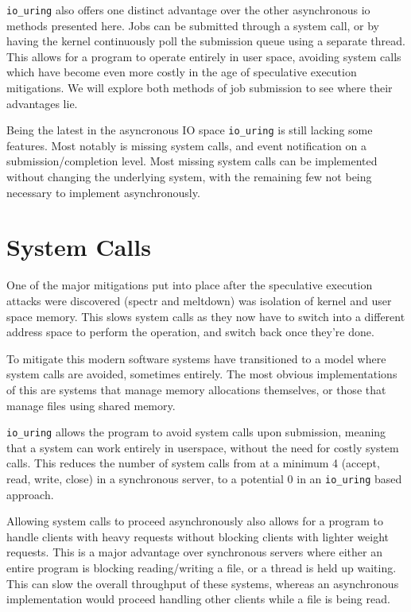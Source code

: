 \documentclass[letterpaper, 10pt, twocolumn]{article}
\begin{document}
\texttt{io\_uring} also offers one distinct advantage over the other asynchronous io methods presented here. Jobs can be submitted through a system call, or by having the kernel continuously poll the submission queue using a separate thread. This allows for a program to operate entirely in user space, avoiding system calls which have become even more costly in the age of speculative execution mitigations. We will explore both methods of job submission to see where their advantages lie.

Being the latest in the asyncronous IO space \texttt{io\_uring} is still lacking some features. Most notably is missing system calls, and event notification on a submission/completion level. Most missing system calls can be implemented without changing the underlying system, with the remaining few not being necessary to implement asynchronously.

\section{System Calls}
\label{sec:org494303b}
One of the major mitigations put into place after the speculative execution attacks were discovered (spectr and meltdown) was isolation of kernel and user space memory. This slows system calls as they now have to switch into a different address space to perform the operation, and switch back once they're done.

To mitigate this modern software systems have transitioned to a model where system calls are avoided, sometimes entirely. The most obvious implementations of this are systems that manage memory allocations themselves, or those that manage files using shared memory.

\texttt{io\_uring} allows the program to avoid system calls upon submission, meaning that a system can work entirely in userspace, without the need for costly system calls. This reduces the number of system calls from at a minimum 4 (accept, read, write, close) in a synchronous server, to a potential 0 in an \texttt{io\_uring} based approach.

Allowing system calls to proceed asynchronously also allows for a program to handle clients with heavy requests without blocking clients with lighter weight requests. This is a major advantage over synchronous servers where either an entire program is blocking reading/writing a file, or a thread is held up waiting. This can slow the overall throughput of these systems, whereas an asynchronous implementation would proceed handling other clients while a file is being read.
\end{document}
